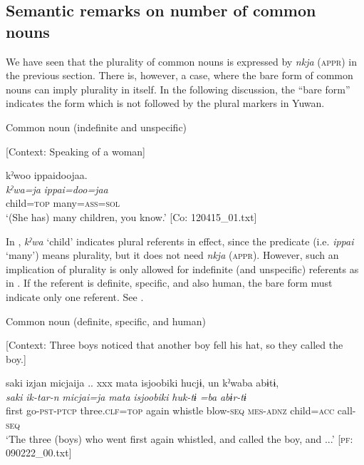 \subsection{Semantic remarks on number of common nouns} \label{sec:7.1.2}

We have seen that the plurality of common nouns is expressed by \textit{nkja} (\textsc{appr}) in the previous section. There is, however, a case, where the bare form of common nouns can imply plurality in itself. In the following discussion, the “bare form” indicates the form which is not followed by the plural markers in Yuwan.

\ea \label{ex:7:4}  Common noun (indefinite and unspecific)

  [Context: Speaking of a woman]

{\TM}
\glll  kˀwoo  ippaidoojaa.\\
\textit{kˀwa=ja}  \textit{ippai=doo=jaa}\\
child=\textsc{top}  many=\textsc{ass}=\textsc{sol}\\
\glt ‘(She has) many children, you know.’ [Co: 120415\_01.txt]

\z

In , \textit{kˀwa} ‘child’ indicates plural referents in effect, since the predicate (i.e. \textit{ippai} ‘many’) means plurality, but it does not need \textit{nkja} (\textsc{appr}). However, such an implication of plurality is only allowed for indefinite (and unspecific) referents as in . If the referent is definite, specific, and also human, the bare form must indicate only one referent. See .

\ea \label{ex:7:5}  Common noun (definite, specific, and human)

  [Context: Three boys noticed that another boy fell his hat, so they called the boy.]

{\TM}
\glll saki  izjan  micjaija ..  xxx  mata  isjoobiki  hucjɨ,  un  kˀwaba  abɨtɨ,\\
\textit{saki}  \textit{ik-tar-n}  \textit{micjai=ja}  {} {}  \textit{mata}  \textit{isjoobiki}  \textit{huk-tɨ}  \textit{}  \textit{=ba}  \textit{abɨr-tɨ}\\
    first  go-\textsc{pst}-\textsc{ptcp}  three.\textsc{clf}=\textsc{top}   {} {} again  whistle  blow-\textsc{seq}  \textsc{mes}-\textsc{adnz}  child=\textsc{acc}  call-\textsc{seq}\\
\glt    ‘The three (boys) who went first again whistled, and called the boy, and ...’ [\textsc{pf}: 090222\_00.txt]

